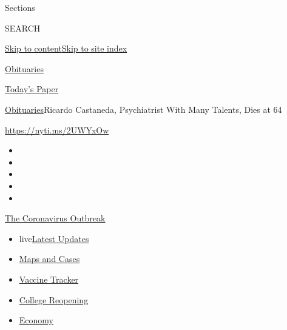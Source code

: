 Sections

SEARCH

\protect\hyperlink{site-content}{Skip to
content}\protect\hyperlink{site-index}{Skip to site index}

\href{https://www.nytimes.com/section/obituaries}{Obituaries}

\href{https://myaccount.nytimes.com/auth/login?response_type=cookie\&client_id=vi}{}

\href{https://www.nytimes.com/section/todayspaper}{Today's Paper}

\href{/section/obituaries}{Obituaries}\textbar{}Ricardo Castaneda,
Psychiatrist With Many Talents, Dies at 64

\url{https://nyti.ms/2UWYxOw}

\begin{itemize}
\item
\item
\item
\item
\item
\end{itemize}

\href{https://www.nytimes.com/news-event/coronavirus?action=click\&pgtype=Article\&state=default\&region=TOP_BANNER\&context=storylines_menu}{The
Coronavirus Outbreak}

\begin{itemize}
\tightlist
\item
  live\href{https://www.nytimes.com/2020/08/03/world/coronavirus-covid-19.html?action=click\&pgtype=Article\&state=default\&region=TOP_BANNER\&context=storylines_menu}{Latest
  Updates}
\item
  \href{https://www.nytimes.com/interactive/2020/us/coronavirus-us-cases.html?action=click\&pgtype=Article\&state=default\&region=TOP_BANNER\&context=storylines_menu}{Maps
  and Cases}
\item
  \href{https://www.nytimes.com/interactive/2020/science/coronavirus-vaccine-tracker.html?action=click\&pgtype=Article\&state=default\&region=TOP_BANNER\&context=storylines_menu}{Vaccine
  Tracker}
\item
  \href{https://www.nytimes.com/2020/08/02/us/covid-college-reopening.html?action=click\&pgtype=Article\&state=default\&region=TOP_BANNER\&context=storylines_menu}{College
  Reopening}
\item
  \href{https://www.nytimes.com/live/2020/08/03/business/stock-market-today-coronavirus?action=click\&pgtype=Article\&state=default\&region=TOP_BANNER\&context=storylines_menu}{Economy}
\end{itemize}

